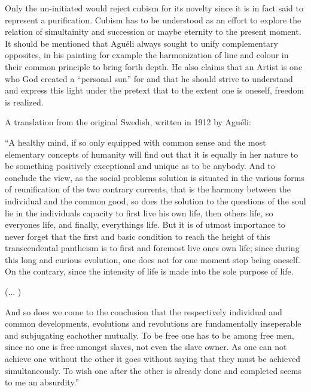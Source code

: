 \begin{footnotesize}
\begin{sffamily}
Only the un-initiated would reject cubism for its novelty since it is in fact said to represent a purification. Cubism has to be understood as an effort to explore the relation of simultainity and succession or maybe eternity to the present moment. It should be mentioned that Aguéli always sought to unify complementary opposites, in his painting for example the harmonization of line and colour in their common principle to bring forth depth. He also claims that an Artist is one who God created a ``personal sun'' for and that he should strive to understand and express this light under the pretext that to the extent one is oneself, freedom is realized.

A translation from the original Swedish, written in 1912 by Aguéli:

``A healthy mind, if so only equipped with common sense and the most elementary concepts of humanity will find out that it is equally in her nature to be something positively exceptional and unique as to be anybody. And to conclude the view, as the social problems solution is situated in the various forms of reunification of the two contrary currents, that is the harmony between the individual and the common good, so does the solution to the questions of the soul lie in the individuals capacity to first live his own life, then others life, so everyones life, and finally, everythings life. But it is of utmost importance to never forget that the first and basic condition to reach the height of this transcendental pantheism is to first and foremost live ones own life; since during this long and curious evolution, one does not for one moment stop being oneself. On the contrary, since the intensity of life is made into the sole purpose of life.

(... )

And so does we come to the conclusion that the respectively individual and common developments, evolutions and revolutions are fundamentally inseperable and subjugating eachother mutually. To be free one has to be among free men, since no one is free amongst slaves, not even the slave owner. As one can not achieve one without the other it goes without saying that they must be achieved simultaneously. To wish one after the other is already done and completed seems to me an absurdity.''


\hfill

\end{sffamily}
\end{footnotesize}

